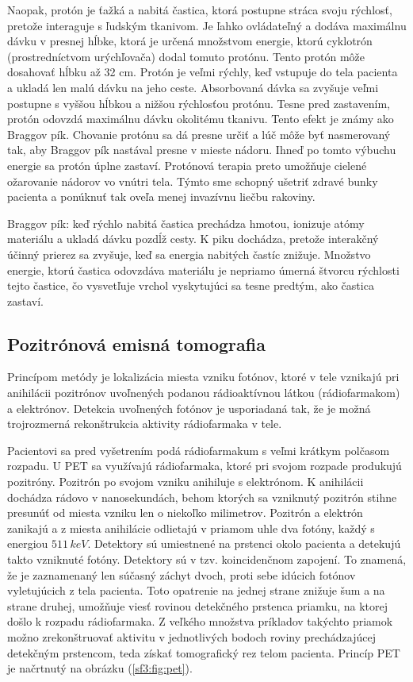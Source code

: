 \documentclass[../../main.tex]{subfiles}
\begin{document}
Naopak, protón je ťažká a nabitá častica, ktorá postupne stráca svoju rýchlosť, pretože interaguje s ľudským tkanivom. Je ľahko ovládateľný a dodáva maximálnu dávku v presnej hĺbke, ktorá je určená množstvom energie, ktorú cyklotrón (prostredníctvom urýchľovača) dodal tomuto protónu. Tento protón môže dosahovať hĺbku až 32 cm. Protón je veľmi rýchly, keď vstupuje do tela pacienta a ukladá len malú dávku na jeho ceste. Absorbovaná dávka sa zvyšuje veľmi postupne s vyššou hĺbkou a nižšou rýchlosťou protónu. Tesne pred zastavením, protón odovzdá maximálnu dávku okolitému tkanivu. Tento efekt je známy ako Braggov pík. Chovanie protónu sa dá presne určiť a lúč môže byť nasmerovaný tak, aby Braggov pík nastával presne v mieste nádoru. Ihneď po tomto výbuchu energie sa protón úplne zastaví. Protónová terapia preto umožňuje cielené ožarovanie nádorov vo vnútri tela. Týmto sme schopný ušetriť zdravé bunky pacienta a ponúknuť tak oveľa menej invazívnu liečbu rakoviny.

Braggov pík: keď rýchlo nabitá častica prechádza hmotou, ionizuje atómy materiálu a ukladá dávku pozdĺž cesty. K piku dochádza, pretože interakčný účinný prierez sa zvyšuje, keď sa energia nabitých častíc znižuje. Množstvo energie, ktorú častica odovzdáva materiálu je nepriamo úmerná štvorcu rýchlosti tejto častice, čo vysvetľuje vrchol vyskytujúci sa tesne predtým, ako častica zastaví.

\subsection{Pozitrónová emisná tomografia}
Princípom metódy je lokalizácia miesta vzniku fotónov, ktoré v tele vznikajú pri anihilácii pozitrónov uvoľnených podanou rádioaktívnou látkou (rádiofarmakom) a elektrónov. Detekcia uvoľnených fotónov je usporiadaná tak, že je možná trojrozmerná rekonštrukcia aktivity rádiofarmaka v tele. 

Pacientovi sa pred vyšetrením podá rádiofarmakum s veľmi krátkym polčasom rozpadu. U PET sa využívajú rádiofarmaka, ktoré pri svojom rozpade produkujú pozitróny. Pozitrón po svojom vzniku anihiluje s elektrónom. K anihilácii dochádza rádovo v nanosekundách, behom ktorých sa vzniknutý pozitrón stihne presunúť od miesta vzniku len o niekoľko milimetrov. Pozitrón a elektrón zanikajú a z miesta anihilácie odlietajú v priamom uhle dva fotóny, každý s energiou $511\,keV$. Detektory sú umiestnené na prstenci okolo pacienta a detekujú takto vzniknuté fotóny. Detektory sú v tzv. koincidenčnom zapojení. To znamená, že  je zaznamenaný len súčasný záchyt dvoch, proti sebe idúcich fotónov vyletujúcich z tela pacienta. Toto opatrenie na jednej strane znižuje šum a na strane druhej, umožňuje viesť rovinou detekčného prstenca priamku, na ktorej došlo k rozpadu rádiofarmaka. Z veľkého množstva príkladov takýchto priamok možno zrekonštruovať aktivitu v jednotlivých bodoch roviny prechádzajúcej detekčným prstencom, teda získať tomografický rez telom pacienta. Princíp PET je načrtnutý na obrázku (\ref{sf3:fig:pet}).
\end{document}
